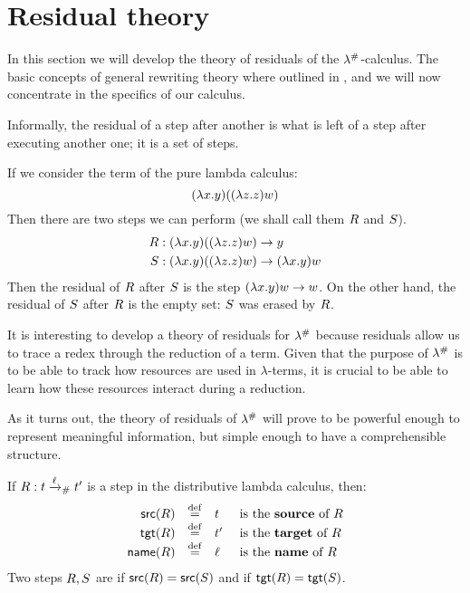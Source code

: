 \chapter{Residual theory}
In this section we will develop the theory of residuals of the $\lambda^{\mathtt{\#}}$-calculus.
The basic concepts of general rewriting theory where outlined in ,
and we will now concentrate in the specifics of our calculus.

Informally, the residual of a step after another is what is left of a step after executing another one; it is a set of steps.

\begin{example} If we consider the term of the pure lambda calculus:
\[(\lambda x. y)((\lambda z. z) w)\]
Then there are two steps we can perform (we shall call them $R$ and $S$).
\begin{align*}
  R &:
    (\lambda x. y)((\lambda z. z) w) \to y \\
  S &:
    (\lambda x. y)((\lambda z. z) w) \to (\lambda x. y) w
\end{align*}
Then the residual of $R$ after $S$ is the step $(\lambda x. y) w \to w$.
On the other hand, the residual of $S$ after $R$ is the empty set:
$S$ was erased by $R$.
\end{example}

It is interesting to develop a theory of residuals for $\lambda^{\mathtt{\#}}$ because
residuals allow us to trace a redex through the reduction of a term.
Given that the purpose of $\lambda^{\mathtt{\#}}$ is to be able to track
how resources are used in $\lambda$-terms, it is crucial to
be able to learn how these resources interact during a reduction.

As it turns out, the theory of residuals of $\lambda^{\mathtt{\#}}$ will prove to be powerful
enough to represent meaningful information, but simple enough to have a
comprehensible structure.


\begin{definition}
If $R : t \mathrel{\xrightarrow{\ell}_{\mathtt{\#}}} t'$ is a step in the distributive lambda
calculus, then:
\[
  \begin{array}{rcll}
    \mathsf{src}(R) & \overset{\mathrm{def}}{=} & t & \text{ is the {\bf source} of $R$} \\
    \mathsf{tgt}(R) & \overset{\mathrm{def}}{=} & t' & \text{ is the {\bf target} of $R$} \\
    \mathsf{name}(R) & \overset{\mathrm{def}}{=} & \ell & \text{ is the {\bf name} of $R$}
  \end{array}
\]
Two steps $R, S$
are  if $\mathsf{src}(R) = \mathsf{src}(S)$
and  if $\mathsf{tgt}(R) = \mathsf{tgt}(S)$.
\end{definition}

